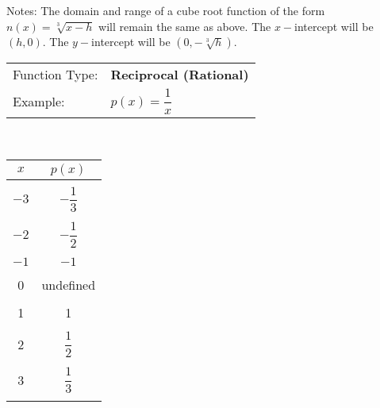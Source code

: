 \documentclass[12pt]{book}
\theoremstyle{definition}
\begin{document}
Notes: The domain and range of a cube root function of the form $n(x)=\sqrt[3]{x-h}$ will remain the same as above.  The $x-$intercept will be $(h,0)$.  The $y-$intercept will be $(0,-\sqrt[3]{h})$. 

\newpage

\begin{multicols}{2}
\begin{center}
\begin{tabular}{ll}
Function Type: &\textbf{Reciprocal (Rational)}\\
Example: &$p(x)=\dfrac{1}{x}$
\end{tabular}
\\
\vspace{0.25in}
\begin{tabular}{c|c}
	$x$ & $p(x)$\\
	\hline
 & \\
$-3$& $-\dfrac{1}{3}$\\
 & \\
 $-2$& $-\dfrac{1}{2}$\\
 & \\
 $-1$& $-1$\\
 & \\
 0& undefined\\
 & \\
 1& 1\\
 & \\
 2& $\dfrac{1}{2}$\\
 & \\
 3& $\dfrac{1}{3}$\\
 & \\
\end{tabular}
\end{center}


\end{multicols}
\end{document}
